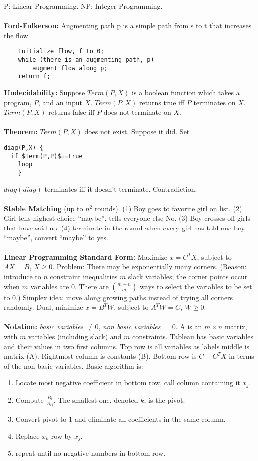 P: Linear Programming.   NP: Integer Programming.\\
\\
{\bf Ford-Fulkerson:} Augmenting path p is a simple path from s to t that
increases the flow.
\begin{verbatim}
    Initialize flow, f to 0;
    while (there is an augmenting path, p)
        augment flow along p;
    return f;
\end{verbatim}
{\bf Undecidability:} Suppose $Term(P,X)$ is a boolean function which takes a program,
$P$, and an input $X$.
$Term(P,X)$ returns true iff $P$ terminates on $X$.
$Term(P,X)$ returns false iff $P$ does not terminate on $X$.
\\
\\
{\bf Theorem:}  $Term(P, X)$ does not exist.  Suppose it did. Set
\begin{verbatim}
diag(P,X) {
  if $Term(P,P)$==true 
    loop
    }
\end{verbatim}
$diag(diag)$ terminates iff it doesn't terminate.  Contradiction.\\
\\
{\bf Stable Matching} (up to $n^2$ rounds). (1) Boy goes to favorite girl
on list.  (2) Girl tells highest choice ``maybe'', tells everyone else
No.  (3) Boy crosses off girls that have said no.
(4) terminate in the round when every girl has
told one boy ``maybe'', convert ``maybe'' to yes.\\
\\
{\bf Linear Programming Standard Form:}
Maximize $x= C^{T}X$, subject to $AX= B$, $X \geq 0$.  
Problem:  There may be exponentially
many corners. (Reason: introduce to $n$ constraint inequalities $m$ slack variables;  the
corner points occur when $m$ variables are $0$.  There are ${{m+n} \choose m}$ ways to select
the variables to be set to $0$.)
Simplex idea: move along growing paths instead of trying all corners randomly.
Dual, minimize $x= B^{T}W$, subject to $A^{T}W= C$, $W \geq 0$.\\
\\
{\bf Notation:} \emph{basic variables} $\ne 0$, \emph{non basic variables} $=0$.  
A is an $m \times n$
matrix, with $m$ variables (including slack) and $m$ constraints.
Tableau has basic variables and their values in two first columns.  Top row is
all variables as labels middle is matrix (A).
Rightmost column is constants (B).  Bottom row is $C-C^{T}X$ in terms of the
non-basic variables.  Basic algorithm is:
\begin{enumerate}
\item Locate most negative coefficient in bottom row, call column containing it $x_{j}$.
\item Compute ${\frac {B_{i}} {A_{ij}}}$.  The smallest one, denoted $k$, is the pivot.
\item Convert pivot to 1 and eliminate all coefficients in the same column.
\item Replace $x_{k}$ row by $x_{j}$.
\item repeat until no negative numbers in bottom row.
\end{enumerate}
